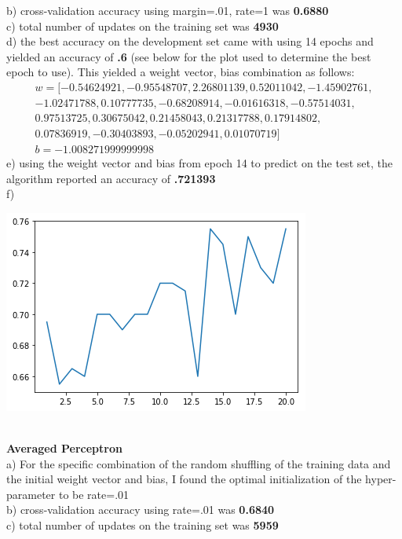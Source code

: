 \documentclass[11pt,a4paper]{article}
\begin{document}
\begin{enumerate}
			b) cross-validation accuracy using margin=.01, rate=1 was \textbf{0.6880}\\
			c) total number of updates on the training set was \textbf{4930}\\
			d) the best accuracy on the development set came with using 14 epochs and yielded an accuracy of \textbf{.6} (see below for the plot used to determine the best epoch to use). This yielded a weight vector, bias combination as follows:\\
			\begin{gather}
			w = [-0.54624921, -0.95548707,  2.26801139,  0.52011042, -1.45902761,\\
			-1.02471788,  0.10777735, -0.68208914, -0.01616318, -0.57514031,\\
			0.97513725,  0.30675042,  0.21458043,  0.21317788,  0.17914802,\\
			0.07836919, -0.30403893, -0.05202941,  0.01070719] \\
			b = -1.008271999999998
			\end{gather}
			e) using the weight vector and bias from epoch 14 to predict on the test set, the algorithm reported an accuracy of \textbf{.721393} \\
			f)
			\begin{center}
				\includegraphics[width=0.7\linewidth]{margin_plot}
			\end{center}
			~\\
			\textbf{Averaged Perceptron}    \\
			a) For the specific combination of the random shuffling of the training data and the initial weight vector and bias, I found the optimal initialization of the hyper-parameter to be rate=.01  \\
			b) cross-validation accuracy using rate=.01 was \textbf{0.6840}\\
			c) total number of updates on the training set was \textbf{5959}\\

\end{enumerate}
\end{document}
